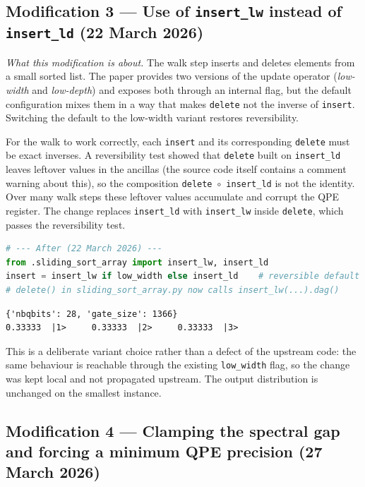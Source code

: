 \documentclass[11pt,a4paper]{article}
\begin{document}
\subsection*{Modification 3 --- Use of \texttt{insert\_lw}
instead of \texttt{insert\_ld} (22 March 2026)}

\emph{What this modification is about.} The walk step inserts and
deletes elements from a small sorted list. The paper provides two
versions of the update operator (\emph{low-width} and \emph{low-depth})
and exposes both through an internal flag, but the default
configuration mixes them in a way that makes \texttt{delete} not the
inverse of \texttt{insert}. Switching the default to the low-width
variant restores reversibility.

For the walk to work correctly, each \texttt{insert} and its
corresponding \texttt{delete} must be exact inverses. A reversibility
test showed that \texttt{delete} built on \texttt{insert\_ld} leaves
leftover values in the ancillas (the source code itself contains a
comment warning about this), so the composition \texttt{delete}~$\circ$~\texttt{insert\_ld}
is not the identity. Over many walk steps these leftover values
accumulate and corrupt the QPE register. The change replaces
\texttt{insert\_ld} with \texttt{insert\_lw} inside \texttt{delete},
which passes the reversibility test.

\begin{lstlisting}[language=Python]
# --- After (22 March 2026) ---
from .sliding_sort_array import insert_lw, insert_ld
insert = insert_lw if low_width else insert_ld    # reversible default
# delete() in sliding_sort_array.py now calls insert_lw(...).dag()
\end{lstlisting}

\begin{lstlisting}[style=plain]
{'nbqbits': 28, 'gate_size': 1366}
0.33333  |1>     0.33333  |2>     0.33333  |3>
\end{lstlisting}

This is a deliberate variant choice rather than a defect of the
upstream code: the same behaviour is reachable through the existing
\texttt{low\_width} flag, so the change was kept local and not
propagated upstream. The output distribution is unchanged on the
smallest instance.

\subsection*{Modification 4 --- Clamping the spectral gap and
forcing a minimum QPE precision (27 March 2026)}
\end{document}
